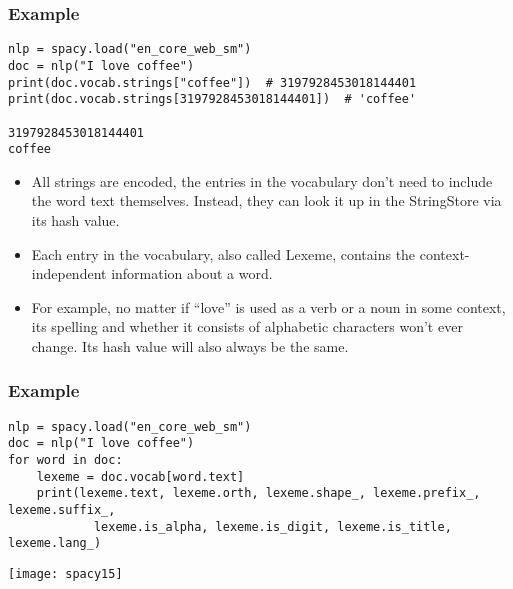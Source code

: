 \begin{frame}[fragile]\frametitle{Example}

\begin{lstlisting}
nlp = spacy.load("en_core_web_sm")
doc = nlp("I love coffee")
print(doc.vocab.strings["coffee"])  # 3197928453018144401
print(doc.vocab.strings[3197928453018144401])  # 'coffee'

3197928453018144401
coffee
\end{lstlisting}

  \begin{itemize}
    \item All strings are encoded, the entries in the vocabulary don't need to include the word text themselves. Instead, they can look it up in the StringStore via its hash value. 
		\item Each entry in the vocabulary, also called Lexeme, contains the context-independent information about a word. 
		\item For example, no matter if “love” is used as a verb or a noun in some context, its spelling and whether it consists of alphabetic characters won't ever change. Its hash value will also always be the same.
  \end{itemize}


\end{frame}

\begin{frame}[fragile]\frametitle{Example}

\begin{lstlisting}
nlp = spacy.load("en_core_web_sm")
doc = nlp("I love coffee")
for word in doc:
    lexeme = doc.vocab[word.text]
    print(lexeme.text, lexeme.orth, lexeme.shape_, lexeme.prefix_, lexeme.suffix_,
            lexeme.is_alpha, lexeme.is_digit, lexeme.is_title, lexeme.lang_)
\end{lstlisting}

	\begin{center}
\texttt{[image: spacy15]}
\end{center}


\end{frame}

